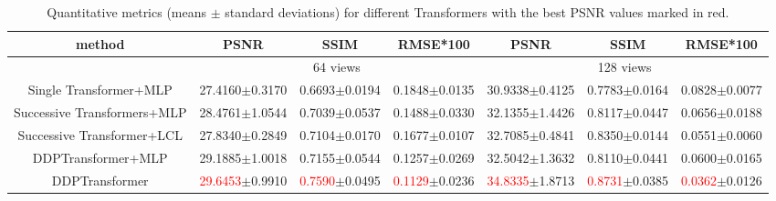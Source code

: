 \documentclass[lettersize,journal]{IEEEtran}
\begin{document}
\begin{table}[!t]
	\caption{Quantitative metrics (means $\pm$ standard deviations) for different Transformers with the best PSNR values marked in red.}
	\label{tab3}
	\centering
		\begin{tabular}{cccc|ccc}
			\hline
			method & PSNR & SSIM & RMSE*100 & PSNR & SSIM& RMSE*100 \\  
			\hline
			& \multicolumn{3}{c|}{64 views} & \multicolumn{3}{c}{128 views} \\ \hline
			Single Transformer+MLP 
			& 27.4160$\pm$0.3170
			& 0.6693$\pm$0.0194 
			& 0.1848$\pm$0.0135
			& 30.9338$\pm$0.4125 
			& 0.7783$\pm$0.0164 
			& 0.0828$\pm$0.0077 \\
			Successive Transformers+MLP
			& 28.4761$\pm$1.0544
			& 0.7039$\pm$0.0537
			& 0.1488$\pm$0.0330 
			& 32.1355$\pm$1.4426
			& 0.8117$\pm$0.0447
			& 0.0656$\pm$0.0188 \\
			Successive Transformer+LCL
			& 27.8340$\pm$0.2849 
			& 0.7104$\pm$0.0170 
			& 0.1677$\pm$0.0107 
			& 32.7085$\pm$0.4841
			& 0.8350$\pm$0.0144
			& 0.0551$\pm$0.0060 \\
			DDPTransformer+MLP
			& 29.1885$\pm$1.0018 
			& 0.7155$\pm$0.0544 
			& 0.1257$\pm$0.0269
			& 32.5042$\pm$1.3632
			& 0.8110$\pm$0.0441
			& 0.0600$\pm$0.0165 \\
			DDPTransformer
			& \textcolor{red}{29.6453}$\pm$0.9910
			& \textcolor{red}{0.7590}$\pm$0.0495
			& \textcolor{red}{0.1129}$\pm$0.0236
			& \textcolor{red}{34.8335}$\pm$1.8713
			& \textcolor{red}{0.8731}$\pm$0.0385
			& \textcolor{red}{0.0362}$\pm$0.0126 \\ 
			\hline
	\end{tabular}
\end{table}
\end{document}
